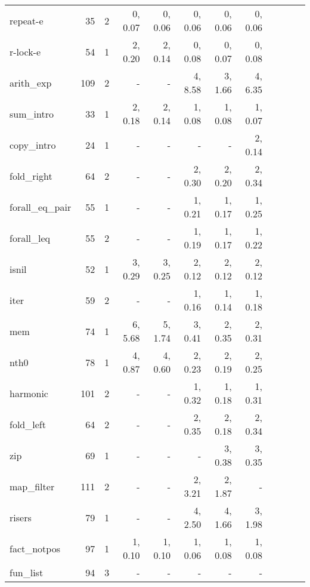 \begin{table*}
\begin{center}
\begin{tabular}{|l|r|r|r|r|r|r|r|r|r|r|r|}
repeat-e          &    35&  2&  0,    0.07 & 0,    0.06 & 0,    0.06 & 0,    0.06 & 0,    0.06 \\
r-lock-e          &    54&  1&  2,    0.20 & 2,    0.14 & 0,    0.08 & 0,    0.07 & 0,    0.08 \\
\hline
arith\_exp        &  109 & 2 &           - &          - & 4,    8.58 & 3,    1.66 & 4,    6.35 \\
sum\_intro        &   33 & 1 &  2,    0.18 & 2,    0.14 & 1,    0.08 & 1,    0.08 & 1,    0.07 \\
copy\_intro       &   24 & 1 &           - &          - &          - &          - & 2,    0.14 \\
fold\_right       &   64 & 2 &           - &          - & 2,    0.30 & 2,    0.20 & 2,    0.34 \\
forall\_eq\_pair  &   55 & 1 &           - &          - & 1,    0.21 & 1,    0.17 & 1,    0.25 \\
forall\_leq       &   55 & 2 &           - &          - & 1,    0.19 & 1,    0.17 & 1,    0.22 \\
isnil             &   52 & 1 &  3,    0.29 & 3,    0.25 & 2,    0.12 & 2,    0.12 & 2,    0.12 \\
iter              &   59 & 2 &           - &          - & 1,    0.16 & 1,    0.14 & 1,    0.18 \\
mem               &   74 & 1 &  6,    5.68 & 5,    1.74 & 3,    0.41 & 2,    0.35 & 2,    0.31 \\
nth0              &   78 & 1 &  4,    0.87 & 4,    0.60 & 2,    0.23 & 2,    0.19 & 2,    0.25 \\
harmonic          &  101 & 2 &           - &          - & 1,    0.32 & 1,    0.18 & 1,    0.31 \\
fold\_left        &   64 & 2 &           - &          - & 2,    0.35 & 2,    0.18 & 2,    0.34 \\
zip               &   69 & 1 &           - &          - &          - & 3,    0.38 & 3,    0.35 \\
map\_filter       &  111 & 2 &           - &          - & 2,    3.21 & 2,    1.87 &          - \\
risers            &   79 & 1 &           - &          - & 4,    2.50 & 4,    1.66 & 3,    1.98 \\
fact\_notpos      &   97 & 1 &  1,    0.10 & 1,    0.10 & 1,    0.06 & 1,    0.08 & 1,    0.08 \\
fun\_list         &    94& 3 &           - &          - &          - &          - &          - \\

\end{tabular}
\end{center}
\end{table*}
